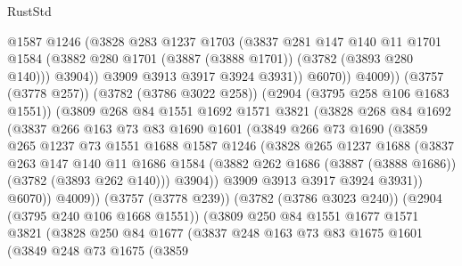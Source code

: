 \begin{lexlean}{RustStd}
\begin{coremodule}
                      @1587
                      @1246
                      (@3828
                        @283
                        @1237
                        @1703
                        (@3837
                          @281
                          @147
                          @140
                          @11
                          @1701
                          @1584
                          (@3882 @280 @1701 (@3887 (@3888 @1701)) (@3782 (@3893 @280 @140)))
                          @3904))
                      @3909
                      @3913
                      @3917
                      @3924
                      @3931))
                  @6070))
              @4009))
          (@3757 (@3778 @257))
          (@3782 (@3786 @3022 @258))
          (@2904 (@3795 @258 @106 @1683 @1551))
          (@3809
            @268
            @84
            @1551
            @1692
            @1571
            @3821
            (@3828
              @268
              @84
              @1692
              (@3837
                @266
                @163
                @73
                @83
                @1690
                @1601
                (@3849
                  @266
                  @73
                  @1690
                  (@3859
                    @265
                    @1237
                    @73
                    @1551
                    @1688
                    @1587
                    @1246
                    (@3828
                      @265
                      @1237
                      @1688
                      (@3837
                        @263
                        @147
                        @140
                        @11
                        @1686
                        @1584
                        (@3882 @262 @1686 (@3887 (@3888 @1686)) (@3782 (@3893 @262 @140)))
                        @3904))
                    @3909
                    @3913
                    @3917
                    @3924
                    @3931))
                @6070))
            @4009))
        (@3757 (@3778 @239))
        (@3782 (@3786 @3023 @240))
        (@2904 (@3795 @240 @106 @1668 @1551))
        (@3809
          @250
          @84
          @1551
          @1677
          @1571
          @3821
          (@3828
            @250
            @84
            @1677
            (@3837
              @248
              @163
              @73
              @83
              @1675
              @1601
              (@3849
                @248
                @73
                @1675
                (@3859

\end{coremodule}
\end{lexlean}
